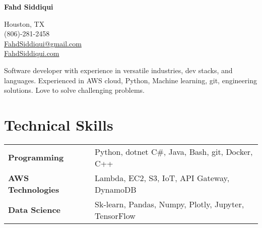 \documentclass[letter,10pt]{article}
\newcommand{\hskills}[1]{
	\textbf{\bfseries #1} }
\begin{document}
	
		\begin{minipage}[c]{0.7\textwidth}
			\raggedright {\fontsize{45}{60}\selectfont \textbf{Fahd Siddiqui}} \hfill \\ %
		\end{minipage}%
		\begin{minipage}[c]{0.3\textwidth}
			\hfill \raggedleft \normalsize Houston, TX \\
			\raggedleft \normalsize (806)-281-2458 \\
			\raggedleft \normalsize \href{mailto:FahdSiddiqui@gmail.com}{FahdSiddiqui@gmail.com} \\
			\raggedleft \normalsize \href{FahdSiddiqui.com}{FahdSiddiqui.com} 
		\end{minipage}   
		
		\vspace{0.25cm} 
		{\color{UI_black} \hrulefill}
	
	\vspace{0.2 cm}
	Software developer with experience in versatile industries, dev stacks, and languages. 
	Experienced in AWS cloud, Python, Machine learning, git, engineering solutions.
	Love to solve challenging problems.
	\vspace{-0.2cm}
	
	
	\section{Technical Skills}
	\begin{tabular}{p{11em} p{1em} p{43em}}
		\hskills{Programming} &  & Python, dotnet C\#, Java, Bash, git, Docker, C++  \\
		\hskills{AWS Technologies}&  &  Lambda, EC2, S3, IoT, API Gateway, DynamoDB \\
		\hskills{Data Science} &  & Sk-learn, Pandas, Numpy, Plotly, Jupyter, TensorFlow \\
	\end{tabular}
	\vspace{-0.2cm}
	
\end{document}
